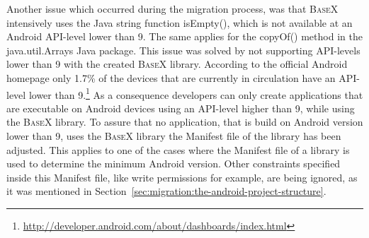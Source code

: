 Another issue which occurred during the migration process, was that \textsc{BaseX} intensively uses the Java string function \textsf{isEmpty()}, which is not available at an Android API-level lower than 9.
The same applies for the \textsf{copyOf()} method in the \textsf{java.util.Arrays} Java package.
This issue was solved by not supporting API-levels lower than 9 with the created \textsc{BaseX} library.
According to the official Android homepage only 1.7\% of the devices that are currently in circulation have an API-level lower than 9.\footnote{\url{http://developer.android.com/about/dashboards/index.html}}
As a consequence developers can only create applications that are executable on Android devices using an API-level higher than 9, while using the \textsc{BaseX} library.
To assure that no application, that is build on Android version lower than 9, uses the \textsc{BaseX} library the Manifest file of the library has been adjusted.
This applies to one of the cases where the Manifest file of a library is used to determine the minimum Android version.
Other constraints specified inside this Manifest file, like write permissions for example, are being ignored, as it was mentioned in Section~\ref{sec:migration:the-android-project-structure}.

